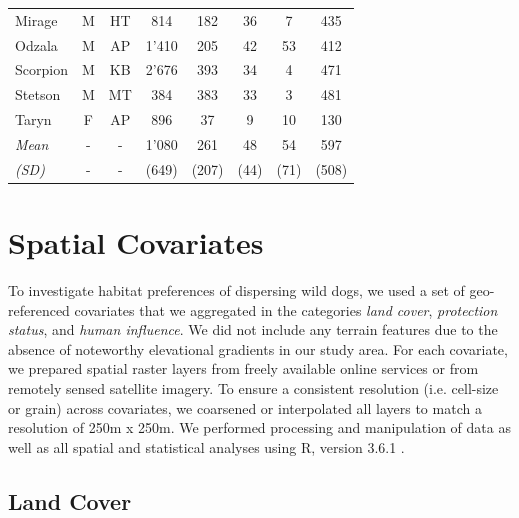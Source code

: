 \documentclass[abstract=off,10pt,a4paper,bibliography=totocnumbered]{article}
\begin{document}
\begin{table}[hbtp]
\begin{center}
{\begin{tabular}{lccccccc}
      Mirage & M & HT & 814 & 182 & 36 & 7 & 435 \\
      Odzala & M & AP & 1'410 & 205 & 42 & 53 & 412 \\
      Scorpion & M & KB & 2'676 & 393 & 34 & 4 & 471 \\
      Stetson & M & MT & 384 & 383 & 33 & 3 & 481 \\
      Taryn & F & AP & 896 & 37 & 9 & 10 & 130 \\
      \toprule
      \toprule
      \textit{Mean} & - & - & 1'080 & 261 & 48 & 54 & 597 \\
      \textit{(SD)} & - & - & (649) & (207) & (44) & (71) & (508) \\
      \bottomrule
      \end{tabular}
    }
  \end{center}
\end{table}
\restoregeometry

\newpage
\section{Spatial Covariates}
To investigate habitat preferences of dispersing wild dogs, we used a set of
geo-referenced covariates that we aggregated in the categories \textit{land
cover}, \textit{protection status}, and \textit{human influence}. We did not
include any terrain features due to the absence of noteworthy elevational
gradients in our study area. For each covariate, we prepared spatial raster
layers from freely available online services or from remotely sensed satellite
imagery. To ensure a consistent resolution (i.e. cell-size or grain) across
covariates, we coarsened or interpolated all layers to match a resolution of
250m x 250m. We performed processing and manipulation of data as well as all
spatial and statistical analyses using R, version 3.6.1 \citep{R.2019}.

\subsection{Land Cover}
\end{document}
